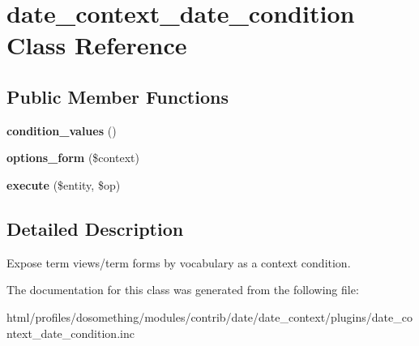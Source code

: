 \hypertarget{classdate__context__date__condition}{
\section{date\_\-context\_\-date\_\-condition Class Reference}
\label{classdate__context__date__condition}
}
\subsection*{Public Member Functions}
\begin{DoxyCompactItemize}
\item 
\hypertarget{classdate__context__date__condition_a23e61f9e40e4e57c747aa9ac1c371f76}{
{\bfseries condition\_\-values} ()}
\label{classdate__context__date__condition_a23e61f9e40e4e57c747aa9ac1c371f76}

\item 
\hypertarget{classdate__context__date__condition_a7950c5180e409d9ffb50a717a10c3dde}{
{\bfseries options\_\-form} (\$context)}
\label{classdate__context__date__condition_a7950c5180e409d9ffb50a717a10c3dde}

\item 
\hypertarget{classdate__context__date__condition_aa2693540e6bfb840bd20f6c35d69f303}{
{\bfseries execute} (\$entity, \$op)}
\label{classdate__context__date__condition_aa2693540e6bfb840bd20f6c35d69f303}

\end{DoxyCompactItemize}


\subsection{Detailed Description}
Expose term views/term forms by vocabulary as a context condition. 

The documentation for this class was generated from the following file:\begin{DoxyCompactItemize}
\item 
html/profiles/dosomething/modules/contrib/date/date\_\-context/plugins/date\_\-context\_\-date\_\-condition.inc\end{DoxyCompactItemize}
